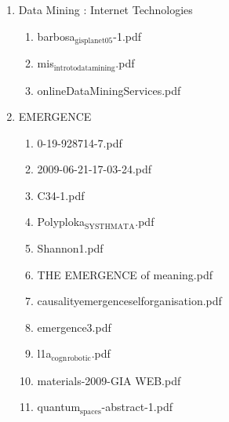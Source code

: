 \documentclass[11pt]{article}
\begin{document}
\begin{enumerate}
\begin{enumerate}
\begin{enumerate}
\begin{enumerate}
\item Data Mining : Internet Technologies
\label{sec-1-1-1-1-7-3-23}
\begin{enumerate}
\item barbosa$_{\text{gisplanet05}}$-1.pdf
\label{sec-1-1-1-1-7-3-23-1}

\item mis$_{\text{introtodatamining}}$.pdf
\label{sec-1-1-1-1-7-3-23-2}

\item onlineDataMiningServices.pdf
\label{sec-1-1-1-1-7-3-23-3}
\end{enumerate}

\item EMERGENCE
\label{sec-1-1-1-1-7-3-24}
\begin{enumerate}
\item 0-19-928714-7.pdf
\label{sec-1-1-1-1-7-3-24-1}

\item 2009-06-21-17-03-24.pdf
\label{sec-1-1-1-1-7-3-24-2}

\item C34-1.pdf
\label{sec-1-1-1-1-7-3-24-3}

\item Polyploka$_{\text{SYSTHMATA}}$.pdf
\label{sec-1-1-1-1-7-3-24-4}

\item Shannon1.pdf
\label{sec-1-1-1-1-7-3-24-5}

\item THE EMERGENCE of meaning.pdf
\label{sec-1-1-1-1-7-3-24-6}

\item causalityemergenceselforganisation.pdf
\label{sec-1-1-1-1-7-3-24-7}

\item emergence3.pdf
\label{sec-1-1-1-1-7-3-24-8}

\item l1a$_{\text{cogn}}$$_{\text{robotic}}$.pdf
\label{sec-1-1-1-1-7-3-24-9}

\item materials-2009-GIA WEB.pdf
\label{sec-1-1-1-1-7-3-24-10}

\item quantum$_{\text{spaces}}$-abstract-1.pdf
\label{sec-1-1-1-1-7-3-24-11}


\end{enumerate}
\end{enumerate}
\end{enumerate}
\end{enumerate}
\end{enumerate}
\end{document}
